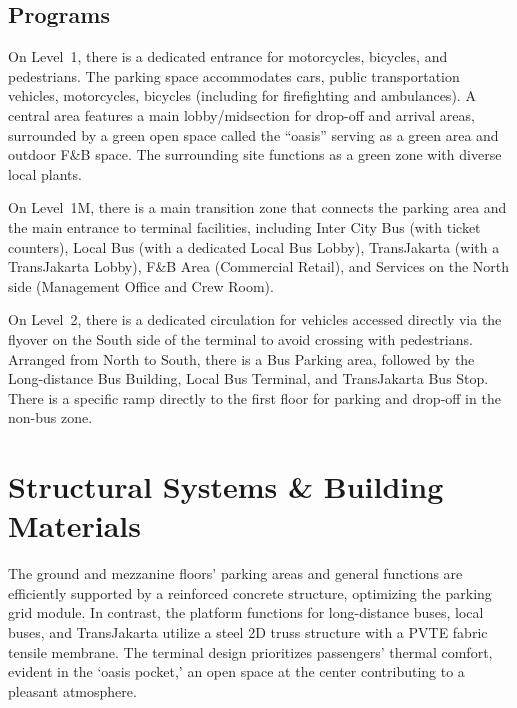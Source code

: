 \begin{specialblock}
	\section*{
	  Programs
	 }
	\setlength{\columnsep}{0.5cm}%
	\begin{multicols*}{3}
		
		\vspace{0.25cm}
		On Level~1, there is a dedicated entrance for motorcycles, bicycles, and pedestrians. The parking space accommodates cars, public transportation vehicles, motorcycles, bicycles (including for firefighting and ambulances). A central area features a main lobby/midsection for drop-off and arrival areas, surrounded by a green open space called the “oasis” serving as a green area and outdoor F\&B space. The surrounding site functions as a green zone with diverse local plants.
		\vfill
		
		\columnbreak%
		
		\vspace{0.25cm}
		On Level~1M, there is a main transition zone that connects the parking area and the main entrance to terminal facilities, including Inter City Bus (with ticket counters), Local Bus (with a dedicated Local Bus Lobby), TransJakarta (with a TransJakarta Lobby), F\&B Area (Commercial Retail), and Services on the North side (Management Office and Crew Room).
		\vfill
		
		\columnbreak%
		
		\vspace{0.25cm}
		On Level~2, there is a dedicated circulation for vehicles accessed directly via the flyover on the South side of the terminal to avoid crossing with pedestrians. Arranged from North to South, there is a Bus Parking area, followed by the Long-distance Bus Building, Local Bus Terminal, and TransJakarta Bus Stop. There is a specific ramp directly to the first floor for parking and drop-off in the non-bus zone.
		\vfill
		
	\end{multicols*}
\end{specialblock}
\newpage
\StartTwoColumnLayoutBeginMulticolsTwo%
\section*{
  Structural Systems \& Building Materials
 }

The ground and mezzanine floors' parking areas and general functions are efficiently supported by a reinforced concrete structure, optimizing the parking grid module. In contrast, the platform functions for long-distance buses, local buses, and TransJakarta utilize a steel 2D truss structure with a PVTE fabric tensile membrane. The terminal design prioritizes passengers' thermal comfort, evident in the ‘oasis pocket,' an open space at the center contributing to a pleasant atmosphere.
\columnbreak%
